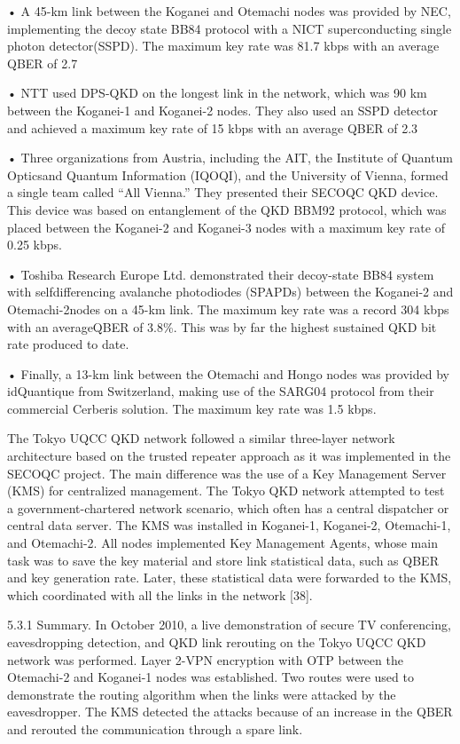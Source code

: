 • A 45-km link between the Koganei and Otemachi nodes was provided by NEC, implementing the decoy state BB84 protocol with a NICT superconducting single photon detector(SSPD). The maximum key rate was 81.7 kbps with an average QBER of 2.7%

• NTT used DPS-QKD on the longest link in the network, which was 90 km between the Koganei-1 and Koganei-2 nodes. They also used an SSPD detector and achieved a maximum key rate of 15 kbps with an average QBER of 2.3%

• Three organizations from Austria, including the AIT, the Institute of Quantum Opticsand Quantum Information (IQOQI), and the University of Vienna, formed a single team called “All Vienna.” They presented their SECOQC QKD device. This device was based on entanglement of the QKD BBM92 protocol, which was placed between the Koganei-2 and Koganei-3 nodes with a maximum key rate of 0.25 kbps.

• Toshiba Research Europe Ltd. demonstrated their decoy-state BB84 system with selfdifferencing avalanche photodiodes (SPAPDs) between the Koganei-2 and Otemachi-2nodes on a 45-km link. The maximum key rate was a record 304 kbps with an averageQBER of 3.8\%. This was by far the highest sustained QKD bit rate produced to date.

• Finally, a 13-km link between the Otemachi and Hongo nodes was provided by idQuantique from Switzerland, making use of the SARG04 protocol from their commercial Cerberis solution. The maximum key rate was 1.5 kbps.

The Tokyo UQCC QKD network followed a similar three-layer network architecture based on the trusted repeater approach as it was implemented in the SECOQC project. The main difference was the use of a Key Management Server (KMS) for centralized management. The Tokyo QKD network attempted to test a government-chartered network scenario, which often has a central dispatcher or central data server. The KMS was installed in Koganei-1, Koganei-2, Otemachi-1, and Otemachi-2. All nodes implemented Key Management Agents, whose main task was to save the key material and store link statistical data, such as QBER and key generation rate. Later, these statistical data were forwarded to the KMS, which coordinated with all the links in the network [38].

5.3.1 Summary. In October 2010, a live demonstration of secure TV conferencing, eavesdropping detection, and QKD link rerouting on the Tokyo UQCC QKD network was performed. Layer
2-VPN encryption with OTP between the Otemachi-2 and Koganei-1 nodes was established. Two routes were used to demonstrate the routing algorithm when the links were attacked by the eavesdropper. The KMS detected the attacks because of an increase in the QBER and rerouted the communication through a spare link.

